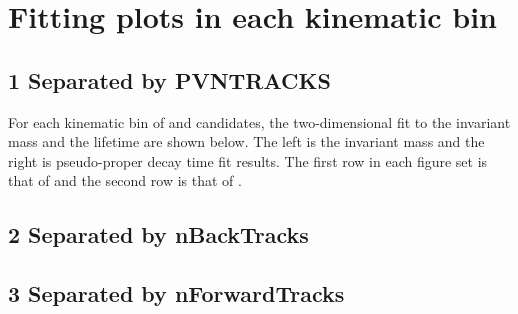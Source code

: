 \section{Fitting plots in each kinematic bin}
\label{sec:FitPlots}
\subsection*{1 Separated by PVNTRACKS}
For each kinematic bin of \jpsi and \psitwos candidates, the two-dimensional fit to the invariant mass and the lifetime are shown below.
The left is the invariant mass and the right is pseudo-proper decay time fit results. The first row in each figure set is  that of \jpsi and the second row is that of \psitwos.

\clearpage

\subsection*{2 Separated by nBackTracks}


\clearpage
\subsection*{3 Separated by nForwardTracks}


\clearpage




    
